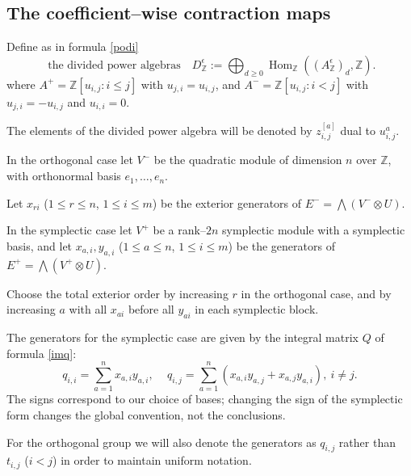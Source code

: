\documentclass[10pt]{amsart}
\theoremstyle{definition}
\theoremstyle{remark}
\newcommand{\Z}{\mathbb Z}
\begin{document}
\subsection{The coefficient--wise contraction maps}
Define as in formula \eqref{podi}\begin{equation}\label{podie}\text{ the divided power algebras}\quad 
 D_{\mathbb Z}^\epsilon:= \bigoplus_{d\geq0}\operatorname{Hom}_{\mathbb Z}
 ((A_{\mathbb Z}^\epsilon)_d,\mathbb Z).
\end{equation}
where $A^+=\Z[u_{i,j}:i\leq j]$ with $u_{j,i}=u_{i,j}$, and $A^-=\Z[u_{i,j}:i<j]$ with $u_{j,i}=-u_{i,j}$ and $u_{i,i}=0$.


The elements of the divided power algebra will be denoted by $z_{i,j}^{[a]}$ dual to $u_{i,j}^{ a }$.\medskip
 

In the orthogonal case let $V^-$ be the  quadratic module of dimension $n$
  over $\Z$, with orthonormal basis $e_1,\ldots,e_n$. \smallskip

 

 Let
$x_{ri}$ ($1\leq r\leq n$, $1\leq i\leq m$) be the exterior generators
of $E^-=\bigwedge(V^-\otimes U)$.  \smallskip



In the symplectic case let $V^+$ be a
rank--$2n$ symplectic module with a symplectic basis, and let
$x_{a,i},y_{a,i}$ ($1\leq a\leq n$, $1\leq i\leq m$) be the generators
of $E^+=\bigwedge(V^+\otimes U)$. \smallskip

 Choose the total exterior order by
increasing $r$ in the orthogonal case, and by increasing $a$ with all
$x_{ai}$ before all $y_{ai}$ in each symplectic block.\medskip

 
The generators for the symplectic case  are given by the integral matrix $Q$ of formula \eqref{imq}:
\begin{equation}\label{imq1}
 q_{i,i}=\sum_{a=1}^n x_{a,i}y_{a,i},
\,\quad 
 q_{i,j}=\sum_{a=1}^n(x_{a,i}y_{a,j}+x_{a,j}y_{a,i}),\ i\neq j.
\end{equation}
The signs correspond to our choice of bases; changing the sign of the
symplectic form changes the global convention, not the conclusions. \smallskip

For the orthogonal group we will also denote the  generators as $q_{i,j}$ rather than $t_{i,j}$ ($i<j$) in order to maintain uniform notation.\medskip
\end{document}
